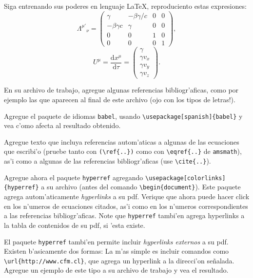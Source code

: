 \documentclass[11pt]{exam}
\begin{document}
\begin{questions}
\item Siga entrenando sus poderes en lenguaje \LaTeX, reproduciento estas expresiones:
\begin{equation}
\Lambda^{\mu'}{}_\nu = \begin{pmatrix}
\gamma & -\beta\gamma/c & 0 & 0\\
-\beta\gamma c & \gamma & 0 & 0\\
0 & 0 & 1 & 0\\
0 & 0 & 0 & 1 \end{pmatrix},
\end{equation}
\begin{equation}
U^\mu = \frac{\text{d}x^\mu}{\text{d}\tau} =
\begin{pmatrix} \gamma \\ \gamma v_x \\ \gamma v_y \\ \gamma v_z \end{pmatrix}.
\end{equation}

\item En su archivo de trabajo, agregue algunas referencias bibliogr'aficas, como por ejemplo las que aparecen al final de este archivo (ojo con los tipos de letras!).

\item Agregue el paquete de idiomas \texttt{babel}, usando \verb|\usepackage[spanish]{babel}| y vea c'omo afecta al resultado obtenido.


\item Agregue texto que incluya referencias autom'aticas a algunas de las ecuaciones que escribi'o (pruebe tanto con \verb|(\ref{..})| como con \verb|\eqref{..}| de \texttt{amsmath}), as'i como a algunas de las referencias bibliogr'aficas (use \verb|\cite{..}|).

\item Agregue ahora el paquete \texttt{hyperref} agregando 
\verb|\usepackage[colorlinks]{hyperref}| a su archivo (antes del comando \verb|\begin{document}|). Este paquete agrega autom'aticamente \textit{hyperlinks} a su pdf. Verique que ahora puede hacer click en los n'umeros de ecuaciones citados, as'i como en los n'umeros correspondientes a las referencias bibliogr'aficas. Note que \texttt{hyperref} tambi'en agrega hyperlinks a la tabla de contenidos de su pdf, si 'esta existe.

\item El paquete \texttt{hyperref} tambi'en permite incluir \textit{hyperlinks externos} a su pdf. Existen b'asicamente dos formas: La m'as simple es incluir comandos como \verb|\url{http://www.cfm.cl}|, que agrega un hyperlink a la direcci'on se\~nalada. Agregue un ejemplo de este tipo a su archivo de trabajo y vea el resultado.


\end{questions}
\end{document}
